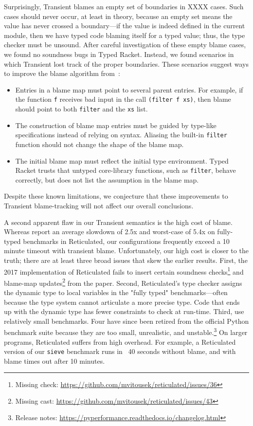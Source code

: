 Surprisingly, Transient blames an empty set of boundaries in XXXX cases.
Such cases should never occur, at least in theory, because an empty set
 means the value has never crossed a boundary---if the value is indeed defined
 in the current module, then we have typed code blaming itself for a typed
 value; thus, the type checker must be unsound.
After careful investigation of these empty blame cases, we found no soundness
 bugs in Typed Racket.
Instead, we found scenarios in which Transient lost track of the proper
 boundaries.
These scenarios suggest ways to improve the blame algorithm from~\citet{vss-popl-2017}:
\begin{itemize}
  \item
    Entries in a blame map must point to several parent entries.
    For example, if the function \texttt{f} receives bad input in the call
    \texttt{(filter f xs)}, then blame should point to both \texttt{filter}
    and the \texttt{xs} list.
  \item
    The construction of blame map entries must be guided by type-like specifications
     instead of relying on syntax.
    Aliasing the built-in \texttt{filter} function should not change the shape
     of the blame map.
  \item
    The initial blame map must reflect the initial type environment.
    Typed Racket trusts that untyped core-library functions, such as \texttt{filter},
     behave correctly, but does not list the assumption in the blame map.
\end{itemize}
\noindent{}Despite these known limitations, we conjecture that these improvements
 to Transient blame-tracking will not affect our overall conclusions.

A second apparent flaw in our Transient semantics is the high cost of blame.
Whereas \citet{vss-popl-2017} report an average slowdown of 2.5x and
 worst-case of 5.4x on fully-typed benchmarks in Reticulated,
 our configurations frequently exceed a 10 minute timeout with transient blame.
Unfortunately, our high cost is closer to the truth;
 there are at least three broad issues that skew the earlier results.
First, the 2017 implementation of Reticulated fails to insert certain
 soundness checks\footnote{Missing check: \url{https://github.com/mvitousek/reticulated/issues/36}}
 and blame-map updates\footnote{Missing cast: \url{https://github.com/mvitousek/reticulated/issues/43}}
 from the paper.
Second, Reticulated's type checker assigns the dynamic type to local
 variables in the "fully typed" benchmarks---often because the type system
 cannot articulate a more precise type.
Code that ends up with the dynamic type has fewer constraints to check at run-time.
Third, \citet{vss-popl-2017} use relatively small benchmarks.
Four have since been retired from the official Python benchmark suite
 because they are too small, unrealistic, and unstable.\footnote{Release notes: \url{https://pyperformance.readthedocs.io/changelog.html}}
On larger programs, Reticulated suffers from high overhead.
For example, a Reticulated version of our \texttt{sieve} benchmark runs in
 ~40 seconds without blame, and with blame times out after 10 minutes.

